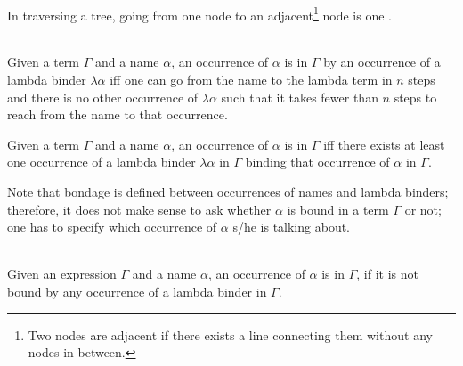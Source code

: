 \documentclass[11pt]{article}
\begin{document}
\medskip
{}\\
In traversing a tree, going from one node to an adjacent\footnote{Two nodes are adjacent if there exists a line connecting them without any nodes in between.} node is one .

\medskip
{}\\
Given a term $\Gamma$ and a name $\alpha$, an occurrence of $\alpha$ is  in $\Gamma$ by an occurrence of a lambda binder  $\lambda\alpha$ iff one can go from the name to the lambda term in $n$ steps and there is no other occurrence of $\lambda\alpha$ such that it takes fewer than $n$ steps to reach from the name to that occurrence.

Given a term $\Gamma$ and a name $\alpha$, an occurrence of $\alpha$ is  in $\Gamma$ iff there exists at least one occurrence of a lambda binder $\lambda\alpha$ in $\Gamma$ binding that occurrence of $\alpha$  in $\Gamma$.

Note that bondage is defined between occurrences of names and lambda binders; therefore, it does not make sense to ask whether $\alpha$ is bound in a term $\Gamma$ or not; one has to specify which occurrence of $\alpha$ s/he is talking about.

\medskip
{}\\
Given an expression $\Gamma$ and a name $\alpha$, an occurrence of $\alpha$ is  in $\Gamma$, if it is not bound by any occurrence of a lambda binder in $\Gamma$. 


% 
% 
% 
\end{document}
